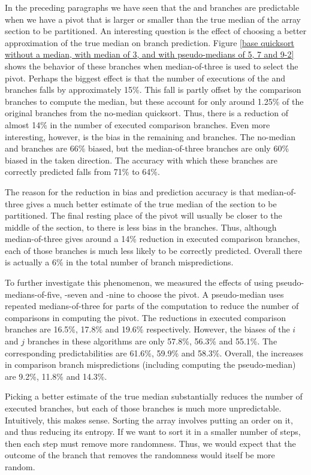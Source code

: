 In the preceding paragraphs we have seen that the  and  branches are
predictable when we have a pivot that is larger or smaller than the true median
of the array section to be partitioned. An interesting question is the effect of
choosing a better approximation of the true median on branch prediction. Figure
\ref{base quicksort without a median, with median of 3, and with pseudo-medians
of 5, 7 and 9-2} shows the behavior of these branches when median-of-three is
used to select the pivot. Perhaps the biggest effect is that the number of
executions of the  and  branches falls by approximately 15\%. This
fall is partly offset by the comparison branches to compute the median, but
these account for only around 1.25\% of the original branches from the no-median
quicksort. Thus, there is a reduction of almost 14\% in the number of executed
comparison branches. Even more interesting, however, is the bias in the
remaining  and  branches. The no-median  and  branches are
66\% biased, but the median-of-three branches are only 60\% biased in the taken
direction. The accuracy with which these branches are correctly predicted falls
from 71\% to 64\%.

The reason for the reduction in bias and prediction accuracy is that
median-of-three gives a much better estimate of the true median of the section
to be partitioned. The final resting place of the pivot will usually be closer
to the middle of the section, to there is less bias in the branches. Thus,
although median-of-three gives around a 14\% reduction in executed comparison
branches, each of those branches is much less likely to be correctly predicted.
Overall there is actually a 6\%  in the total number of branch
mispredictions.

To further investigate this phenomenon, we measured the effects of using
pseudo-medians-of-five, -seven and -nine to choose the pivot. A pseudo-median
uses repeated medians-of-three for parts of the computation to reduce the number
of comparisons in computing the pivot. The reductions in executed comparison
branches are 16.5\%, 17.8\% and 19.6\% respectively. However, the biases of the
$i$ and $j$ branches in these algorithms are only 57.8\%, 56.3\% and 55.1\%. The
corresponding predictabilities are 61.6\%, 59.9\% and 58.3\%. Overall, the
increases in comparison branch mispredictions (including computing the
pseudo-median) are 9.2\%, 11.8\% and 14.3\%. 

Picking a better estimate of the true median substantially reduces the number of
executed branches, but each of those branches is much more unpredictable.
Intuitively, this makes sense. Sorting the array involves putting an order on
it, and thus reducing its entropy. If we want to sort it in a smaller number of
steps, then each step must remove more randomness. Thus, we would expect that
the outcome of the branch that removes the randomness would itself be more
random.

